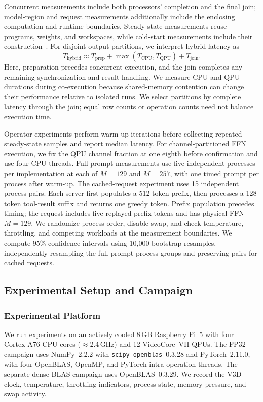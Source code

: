 \documentclass[sigplan,screen,review]{acmart}
\begin{document}
Concurrent measurements include both processors' completion and the final join; model-region and request measurements additionally include the enclosing computation and runtime boundaries. Steady-state measurements reuse programs, weights, and workspaces, while cold-start measurements include their construction~\cite{marculescu2018hardwareaware}. For disjoint output partitions, we interpret hybrid latency as
\begin{equation}
T_{\mathrm{hybrid}}
\approx
T_{\mathrm{prep}}
+
\max\!\left(T_{\mathrm{CPU}},T_{\mathrm{QPU}}\right)
+
T_{\mathrm{join}}.
\end{equation}
Here, preparation precedes concurrent execution, and the join completes any remaining synchronization and result handling. We measure CPU and QPU durations during co-execution because shared-memory contention can change their performance relative to isolated runs. We select partitions by complete latency through the join; equal row counts or operation counts need not balance execution time.

Operator experiments perform warm-up iterations before collecting repeated steady-state samples and report median latency. For channel-partitioned FFN execution, we fix the QPU channel fraction at one eighth before confirmation and use four CPU threads. Full-prompt measurements use five independent processes per implementation at each of $M=129$ and $M=257$, with one timed prompt per process after warm-up. The cached-request experiment uses 15 independent process pairs. Each server first populates a 512-token prefix, then processes a 128-token tool-result suffix and returns one greedy token. Prefix population precedes timing; the request includes five replayed prefix tokens and has physical FFN $M=129$. We randomize process order, disable swap, and check temperature, throttling, and competing workloads at the measurement boundaries. We compute 95\% confidence intervals using 10,000 bootstrap resamples, independently resampling the full-prompt process groups and preserving pairs for cached requests.



\subsection{Experimental Setup and Campaign}

\subsubsection{Experimental Platform}
We run experiments on an actively cooled 8\,GB Raspberry Pi~5 with four Cortex-A76 CPU cores ($\approx$2.4\,GHz) and 12 VideoCore~VII QPUs. The FP32 campaign uses NumPy~2.2.2 with \texttt{scipy-openblas}~0.3.28 and PyTorch~2.11.0, with four OpenBLAS, OpenMP, and PyTorch intra-operation threads. The separate dense-BLAS campaign uses OpenBLAS~0.3.29. We record the V3D clock, temperature, throttling indicators, process state, memory pressure, and swap activity.
\end{document}

